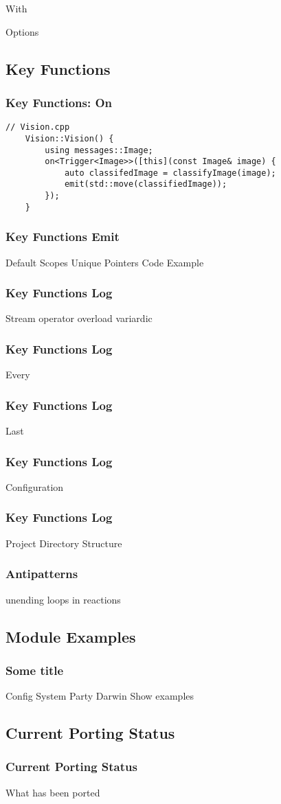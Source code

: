 \documentclass{beamer}
\begin{document}
\begin{frame}
	With
\end{frame}

\begin{frame}
	Options
\end{frame}

\subsection{Key Functions}
\begin{frame}[fragile]
    \frametitle{Key Functions: On}
	\begin{lstlisting}[language=nuclear]
	// Vision.cpp
	Vision::Vision() {
	    using messages::Image;
	    on<Trigger<Image>>([this](const Image& image) {
	        auto classifedImage = classifyImage(image);
	        emit(std::move(classifiedImage));
	    });
	}
	\end{lstlisting}
\end{frame}

\begin{frame}
    \frametitle{Key Functions Emit}
	Default
	Scopes
	Unique Pointers
	Code Example
\end{frame}

\begin{frame}
    \frametitle{Key Functions Log}
	Stream operator overload
	variardic
\end{frame}

\begin{frame}
    \frametitle{Key Functions Log}
	Every
\end{frame}

\begin{frame}
    \frametitle{Key Functions Log}
	Last
\end{frame}

\begin{frame}
    \frametitle{Key Functions Log}
	Configuration
\end{frame}


\begin{frame}
    \frametitle{Key Functions Log}
	Project Directory Structure
\end{frame}

\begin{frame}
    \frametitle{Antipatterns}
	unending loops in reactions
\end{frame}

\subsection{Module Examples}
\begin{frame}
    \frametitle{Some title}
	Config System
	Party Darwin
	Show examples
\end{frame}

\subsection{Current Porting Status}
\begin{frame}
    \frametitle{Current Porting Status}
	What has been ported
\end{frame}
\end{document}
